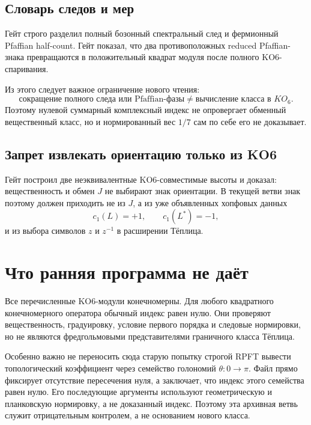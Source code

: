\subsection{Словарь следов и мер}

Гейт  строго разделил
полный бозонный спектральный след и фермионный Pfaffian half-count.
Гейт  показал, что два
противоположных reduced Pfaffian-знака превращаются в положительный
квадрат модуля после полного KO6-спаривания.

Из этого следует важное ограничение нового чтения:
\begin{equation}
 \text{сокращение полного следа или Pfaffian-фазы}
 \ne
 \text{вычисление класса в }KO_6.
 \label{eq:v5-retro-trace-not-kclass}
\end{equation}
Поэтому нулевой суммарный комплексный индекс не опровергает обменный
вещественный класс, но и нормированный вес $1/7$ сам по себе его не
доказывает.

\subsection{Запрет извлекать ориентацию только из KO6}

Гейт  построил две
неэквивалентные KO6-совместимые высоты и доказал: вещественность и обмен
$J$ не выбирают знак ориентации. В текущей ветви знак поэтому должен
приходить не из $J$, а из уже объявленных хопфовых данных
\begin{equation}
 c_1(L)=+1,
 \qquad
 c_1(L^*)=-1,
\end{equation}
и из выбора символов $z$ и $z^{-1}$ в расширении Тёплица.

\section{Что ранняя программа не даёт}

Все перечисленные KO6-модули конечномерны. Для любого квадратного
конечномерного оператора обычный индекс равен нулю. Они проверяют
вещественность, градуировку, условие первого порядка и следовые
нормировки, но не являются фредгольмовыми представителями граничного
класса Тёплица.

Особенно важно не переносить сюда старую попытку строгой RPFT вывести
топологический коэффициент через семейство голономий $\theta:0\to\pi$.
Файл  прямо фиксирует
отсутствие пересечения нуля, а
 заключает, что индекс
этого семейства равен нулю. Его последующие аргументы используют
геометрическую и планковскую нормировку, а не доказанный индекс. Поэтому
эта архивная ветвь служит отрицательным контролем, а не основанием нового
класса.

